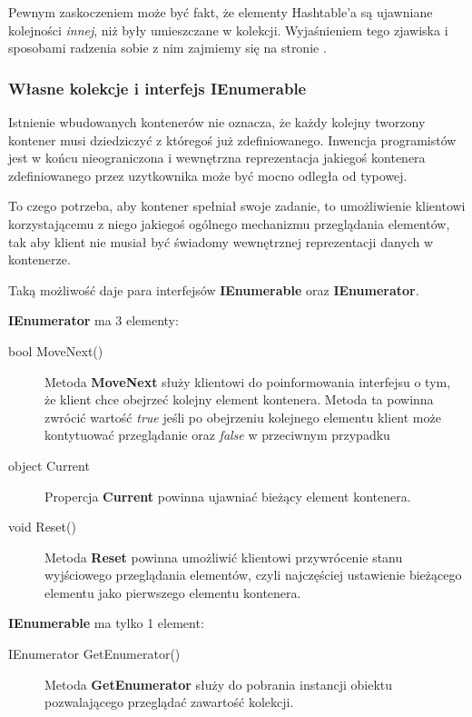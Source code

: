 Pewnym zaskoczeniem może być fakt, że elementy Hashtable'a są ujawniane kolejności {\em innej}, niż 
były umieszczane w kolekcji. Wyjaśnieniem tego zjawiska i sposobami 
radzenia sobie z nim zajmiemy się na stronie \pageref{sect:skladanie_enum}.

\subsubsection{Własne kolekcje i interfejs {\bf IEnumerable}}

Istnienie wbudowanych kontenerów nie oznacza, że każdy kolejny tworzony kontener musi dziedziczyć
z któregoś już zdefiniowanego. Inwencja programistów jest w końcu nieograniczona i wewnętrzna
reprezentacja jakiegoś kontenera zdefiniowanego przez uzytkownika może być mocno odległa od
typowej. 

To czego potrzeba, aby kontener spełniał swoje zadanie, to umożliwienie klientowi korzystającemu z niego
jakiegoś ogólnego mechanizmu przeglądania elementów, tak aby klient nie musiał być świadomy
wewnętrznej reprezentacji danych w kontenerze.

Taką możliwość daje para interfejsów {\bf IEnumerable} oraz {\bf IEnumerator}.

{\bf IEnumerator} ma 3 elementy:

\begin{description}
\item [bool MoveNext()] 
Metoda {\bf MoveNext} służy klientowi do poinformowania interfejsu o tym, że klient chce
obejrzeć kolejny element kontenera. Metoda ta powinna zwrócić wartość {\em true} jeśli po obejrzeniu
kolejnego elementu klient może kontytuować przeglądanie oraz {\em false} w przeciwnym przypadku

\item [object Current]
Propercja {\bf Current} powinna ujawniać bieżący element kontenera. 

\item [void Reset()]
Metoda {\bf Reset} powinna umożliwić klientowi przywrócenie stanu wyjściowego przeglądania elementów,
czyli najczęściej ustawienie bieżącego elementu jako pierwszego elementu kontenera.
\end{description}

{\bf IEnumerable} ma tylko 1 element:

\begin{description}
\item [IEnumerator GetEnumerator()] 
Metoda {\bf GetEnumerator} służy do pobrania instancji obiektu pozwalającego przeglądać zawartość
kolekcji. 
\end{description}

